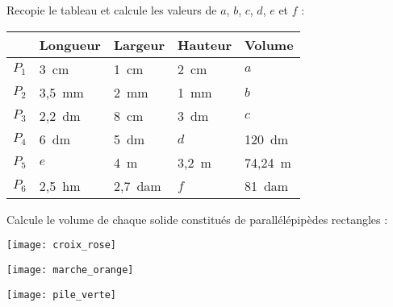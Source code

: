 \begin{exercice}
Recopie le tableau et calcule les valeurs de $a$, $b$, $c$, $d$, $e$ et $f$ :
\begin{center}
 \begin{tabularx}{\linewidth}{|c|*{4}{>{\centering\arraybackslash}X|}}
 \hline
 & \cellcolor{H2} Longueur & \cellcolor{H2} Largeur & \cellcolor{H2} Hauteur & \cellcolor{H2} Volume \\\hline
 \cellcolor{U1} $P_1$ & \cellcolor{H3} 3 cm & \cellcolor{H3} 1 cm & \cellcolor{H3} 2 cm & \cellcolor{H3} $a$ \\\hline
 \cellcolor{U1} $P_2$ & \cellcolor{H3} 3,5 mm & \cellcolor{H3} 2 mm & \cellcolor{H3} 1 mm & \cellcolor{H3} $b$ \\\hline
 \cellcolor{U1} $P_3$ & \cellcolor{H3} 2,2 dm & \cellcolor{H3} 8 cm & \cellcolor{H3} 3 dm & \cellcolor{H3} $c$ \\\hline
 \cellcolor{U1} $P_4$ & \cellcolor{H3} 6 dm & \cellcolor{H3} 5 dm & \cellcolor{H3} $d$ & \cellcolor{H3} 120 dm\up{3} \\\hline
 \cellcolor{U1} $P_5$ & \cellcolor{H3} $e$ & \cellcolor{H3} 4 m & \cellcolor{H3} 3,2 m & \cellcolor{H3} 74,24 m\up{3} \\\hline
 \cellcolor{U1} $P_6$ & \cellcolor{H3} 2,5 hm & \cellcolor{H3} 2,7 dam & \cellcolor{H3} $f$ & \cellcolor{H3} 81 dam\up{3} \\\hline
 \end{tabularx}
 \end{center}
\end{exercice}

\newpage

\begin{exercice}
Calcule le volume de chaque solide constitués de parallélépipèdes rectangles :
\begin{colenumerate}{2}
 \item 
 
 \texttt{[image: croix\_rose]}
 \item 
 
 \texttt{[image: marche\_orange]}
 \item 
 
 \texttt{[image: pile\_verte]}

 \end{colenumerate}
\end{exercice}


